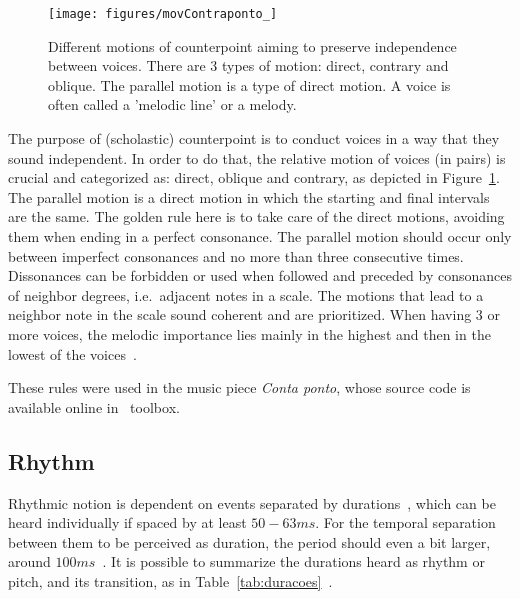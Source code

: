 \begin{figure}[h!]
    \centering
        \texttt{[image: figures/movContraponto\_]}
    \caption{Different motions of counterpoint aiming to preserve independence
        between voices. There are 3 types of motion: direct, contrary and
        oblique. The parallel motion is a type of direct motion.
	A voice is often called a 'melodic line' or a melody.}
        \label{fig:movContraponto}
\end{figure}

The purpose of (scholastic) counterpoint is to conduct voices in a way that they sound independent. In order to do that, the relative motion of voices (in pairs) is crucial and
categorized as: direct, oblique and contrary, as depicted in Figure~\ref{fig:movContraponto}.
The parallel motion is a direct motion in which the starting and final intervals are the same.
The golden rule here is to take care of the direct motions, avoiding them
when ending in a perfect consonance. The parallel motion should occur only between
imperfect consonances and no more than three consecutive times. Dissonances can be forbidden or used when followed and preceded by consonances of neighbor
degrees, i.e.\ adjacent notes in a scale. The motions that lead to a
neighbor note in the scale sound coherent and are prioritized. When having 3 or more voices, the melodic
importance lies mainly in the highest and then in the lowest of the voices~\cite{Fux,Tragtenberg,SchoenbergContra}.

These rules were used in the music piece \emph{Conta ponto}, whose source code is
available online in \massa\ toolbox.

\subsection{Rhythm}\label{subsec:ritmo}
Rhythmic notion is dependent on events separated by durations~\cite{Lacerda}, which can be heard individually if spaced by at least $50-63ms$. For the temporal separation between them to be perceived as duration, the period should even a bit larger, around $100ms$~\cite{microsound}.
It is possible to summarize the durations heard as rhythm or pitch, and its transition,
as in Table~\ref{tab:duracoes}~\cite{Alfaix, microsound}.

